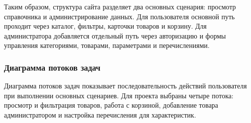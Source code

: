 \documentclass[a4paper,14pt]{extarticle}
\begin{document}
Таким образом, структура сайта разделяет два основных сценария: просмотр справочника и администрирование данных. Для пользователя основной путь проходит через каталог, фильтры, карточки товаров и корзину. Для администратора добавляется отдельный путь через авторизацию и формы управления категориями, товарами, параметрами и перечислениями.

\subsubsection{Диаграмма потоков задач}

Диаграмма потоков задач показывает последовательность действий пользователя при выполнении основных сценариев. Для проекта выбраны четыре потока: просмотр и фильтрация товаров, работа с корзиной, добавление товара администратором и настройка перечисления для характеристик.
\end{document}
